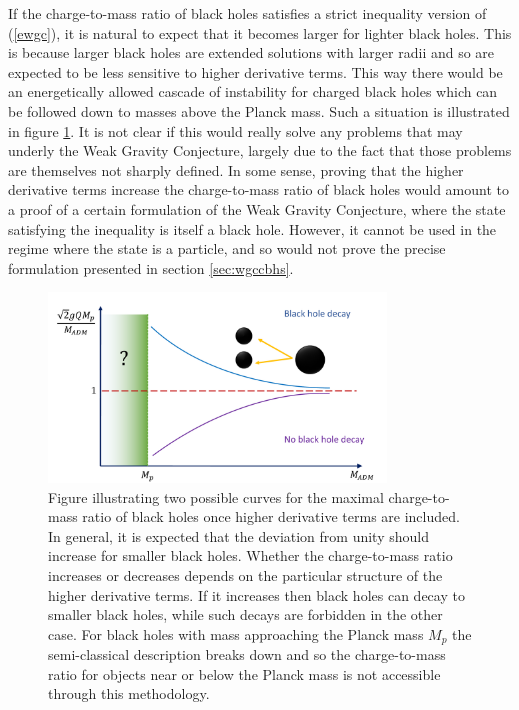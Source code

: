 \documentclass[11pt,a4paper]{article}
\numberwithin{equation}{section}
\numberwithin{table}{section}\setlength{\multlinegap}{25pt}
\begin{document}
If the charge-to-mass ratio of black holes satisfies a strict inequality version of (\ref{ewgc}), it is natural to expect that it becomes larger for lighter black holes. This is because larger black holes are extended solutions with larger radii and so are expected to be less sensitive to higher derivative terms. This way there would be an energetically allowed cascade of instability for charged black holes which can be followed down to masses above the Planck mass. Such a situation is illustrated in figure \ref{fig:ctmpl}. It is not clear if this would really solve any problems that may underly the Weak Gravity Conjecture, largely due to the fact that those problems are themselves not sharply defined. In some sense, proving that the higher derivative terms increase the charge-to-mass ratio of black holes would amount to a proof of a certain formulation of the Weak Gravity Conjecture, where the state satisfying the inequality is itself a black hole. However, it cannot be used in the regime where the state is a particle, and so would not prove the precise formulation presented in section \ref{sec:wgccbhs}.
\begin{figure}[t]
\centering
 \includegraphics[width=0.8\textwidth]{figctmpl.pdf}
\caption{Figure illustrating two possible curves for the maximal charge-to-mass ratio of black holes once higher derivative terms are included. In general, it is expected that the deviation from unity should increase for smaller black holes. Whether the charge-to-mass ratio increases or decreases depends on the particular structure of the higher derivative terms. If it increases then black holes can decay to smaller black holes, while such decays are forbidden in the other case. For black holes with mass approaching the Planck mass $M_p$ the semi-classical description breaks down and so the charge-to-mass ratio for objects near or below the Planck mass is not accessible through this methodology.}
\label{fig:ctmpl}
\end{figure}
\end{document}
